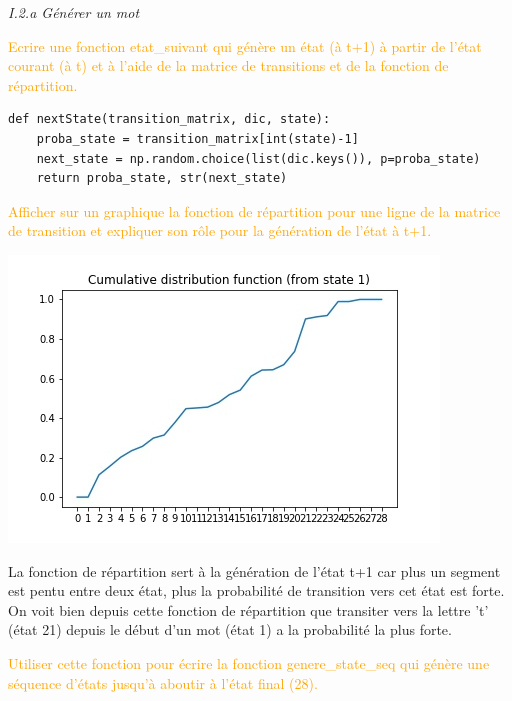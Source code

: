 \documentclass[11pt,a4paper,fleqn]{article}
\begin{document}
\textit{I.2.a Générer un mot}

\vspace{5mm}
\textcolor{orange}{Ecrire une fonction etat\_suivant qui génère un état (à t+1) à partir de l’état courant (à t) et à
l’aide de la matrice de transitions et de la fonction de répartition.}

\lstset{language=Python}
\lstset{frame=lines}
\lstset{basicstyle=\footnotesize}
\begin{lstlisting}
def nextState(transition_matrix, dic, state):
    proba_state = transition_matrix[int(state)-1]
    next_state = np.random.choice(list(dic.keys()), p=proba_state)
    return proba_state, str(next_state)
\end{lstlisting}

\vspace{5mm}
\textcolor{orange}{Afficher sur un graphique la fonction de répartition pour une ligne de la matrice de transition
et expliquer son rôle pour la génération de l’état à t+1.}

\begin{center}
\includegraphics[scale = 0.5]{cdf_state_1.jpg}
\end{center}

La fonction de répartition sert à la génération de l'état t+1 car plus un segment est pentu entre deux état, plus la probabilité de transition vers cet état est forte. On voit bien depuis cette fonction de répartition que transiter vers la lettre 't' (état 21) depuis le début d'un mot (état 1) a la probabilité la plus forte.

\vspace{5mm}
\textcolor{orange}{Utiliser cette fonction pour écrire la fonction genere\_state\_seq qui génère une séquence d’états jusqu’à aboutir à l’état final (28).}
\end{document}

